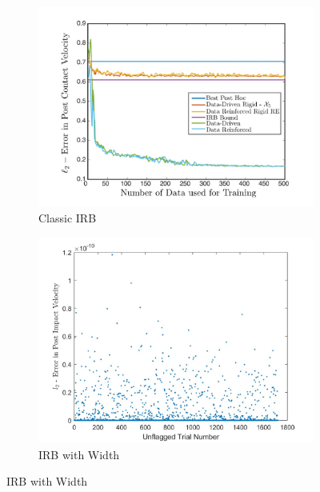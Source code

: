 \documentclass{article}
\begin{document}
\begin{figure}[ht]
    \caption{Comparison of Errors for IRB With and Without Width}
    \centering
    \begin{subfigure}[b]{0.45\linewidth}
        \includegraphics[scale=0.45]{nima1.jpg}
        \caption{Classic IRB\cite{nimaPaper}}
        \label{fig:cIRB}
    \end{subfigure}
    \quad
    \begin{subfigure}[b]{0.45\linewidth}
       \includegraphics[scale=0.12]{errorWidth.jpg}
        \caption{IRB with Width}
        \label{fig:wIRB}
    \end{subfigure}
\end{figure}




\end{document}
